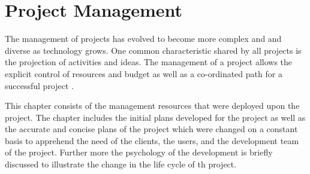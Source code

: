 \chapter{Project Management}
\label{cha:project_management}

The management of projects has evolved to become more complex and and diverse as
technology grows. One common characteristic shared by all projects is the
projection of activities and ideas. The management of a project allows the
explicit control of resources and budget as well as a co-ordinated path for a
successful project \citep{projMan86}. 

This chapter consists of the management resources that were deployed upon the project. The chapter includes the initial plans developed for the project as well as the accurate and concise plans of the project which were changed on a constant basis to apprehend the need of the clients, the users, and the development team of the project. Further more the psychology of the development is briefly discussed to illustrate the change in the life cycle of th project.

\newpage 


\newpage 


\newpage 


\newpage 


\newpage


\newpage 


\newpage 


%

%
